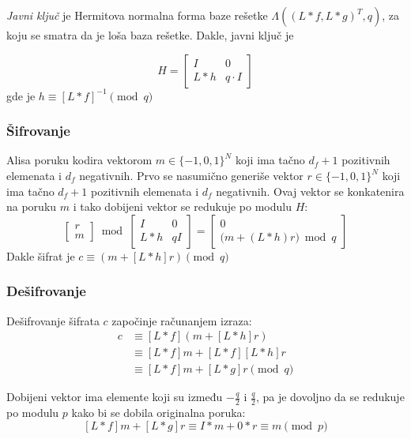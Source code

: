 \textit{Javni ključ} je Hermitova normalna forma baze rešetke $\Lambda((L \ast f, L\ast g)^T, q)$, za koju se smatra da je loša baza rešetke. Dakle, javni ključ je

\[H = \begin{bmatrix}
    I & 0\\
    L\ast h & q \cdot I
    \end{bmatrix}\]
gde je $h \equiv [L \ast f]^{-1} \pmod q$

\subsubsection{Šifrovanje}

Alisa poruku kodira vektorom $m \in \{-1,0,1\}^N$ koji ima tačno $d_f+1$ pozitivnih elemenata i $d_f$ negativnih. Prvo se nasumično generiše vektor $r \in \{-1,0,1\}^N$ koji ima tačno $d_f+1$ pozitivnih elemenata i $d_f$ negativnih. Ovaj vektor se konkatenira na poruku $m$ i tako dobijeni vektor se redukuje po modulu $H$:
\[
\begin{bmatrix}
    r \\
    m
\end{bmatrix}
\bmod
\begin{bmatrix}
    I & 0 \\
    L \ast h & qI
\end{bmatrix}
=
\begin{bmatrix}
    0 \\
    \bigl(m + (L \ast h)r\bigr) \bmod q
\end{bmatrix}
\]
Dakle šifrat je $c \equiv (m + [L \ast h]r) \pmod q$


\subsubsection{Dešifrovanje}

Dešifrovanje šifrata $c$ započinje računanjem izraza:
\begin{align*}
[L\ast f]c
&\equiv [L\ast f](m+[L\ast h]r) \\
&\equiv [L\ast f]m + [L\ast f][L\ast h]r \\
&\equiv [L\ast f]m + [L\ast g]r
\pmod q
\end{align*}

Dobijeni vektor ima elemente koji su između $-\frac{q}{2}$ i $\frac{q}{2}$, pa je dovoljno da se redukuje po modulu $p$ kako bi se dobila originalna poruka:
\[[L \ast f ]m + [L \ast g]r \equiv I \ast m + 0\ast r \equiv m \pmod p \]


